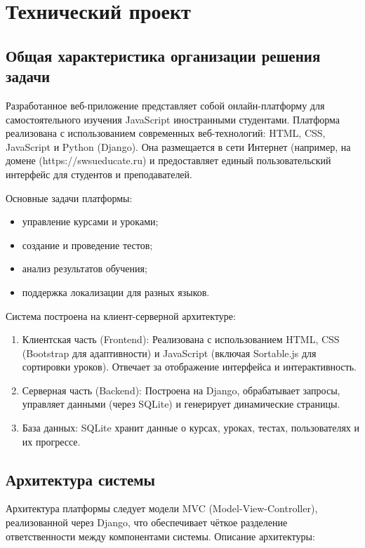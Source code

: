 \section{Технический проект}

\subsection{Общая характеристика организации решения задачи}

Разработанное веб-приложение представляет собой онлайн-платформу для самостоятельного изучения JavaScript иностранными студентами. Платформа реализована с использованием современных веб-технологий: HTML, CSS, JavaScript и Python (Django). Она размещается в сети Интернет (например, на домене (https://swsueducate.ru) и предоставляет единый пользовательский интерфейс для студентов и преподавателей.

Основные задачи платформы:
\begin{itemize}
	\item управление курсами и уроками;
	\item создание и проведение тестов;
	\item анализ результатов обучения;
	\item поддержка локализации для разных языков.
\end{itemize}

Система построена на клиент-серверной архитектуре:
\begin{enumerate}
	\item {Клиентская часть} (Frontend): Реализована с использованием HTML, CSS (Bootstrap для адаптивности) и JavaScript (включая Sortable.js для сортировки уроков). Отвечает за отображение интерфейса и интерактивность.
	\item {Серверная часть} (Backend): Построена на Django, обрабатывает запросы, управляет данными (через SQLite) и генерирует динамические страницы.
	\item {База данных}: SQLite хранит данные о курсах, уроках, тестах, пользователях и их прогрессе.
\end{enumerate}

\subsection{Архитектура системы}

Архитектура платформы следует модели MVC (Model-View-Controller), реализованной через Django, что обеспечивает чёткое разделение ответственности между компонентами системы. Описание архитектуры:

